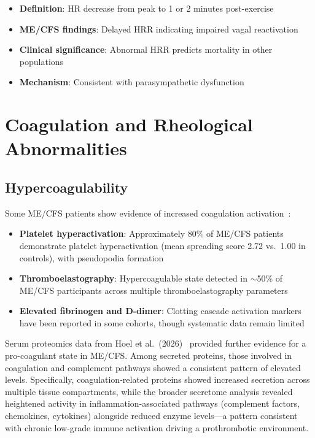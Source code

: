 \begin{itemize}
    \item \textbf{Definition}: HR decrease from peak to 1 or 2 minutes post-exercise
    \item \textbf{ME/CFS findings}: Delayed HRR indicating impaired vagal reactivation
    \item \textbf{Clinical significance}: Abnormal HRR predicts mortality in other populations
    \item \textbf{Mechanism}: Consistent with parasympathetic dysfunction
\end{itemize}

\section{Coagulation and Rheological Abnormalities}
\label{sec:coagulation}

\subsection{Hypercoagulability}
\label{sec:hypercoagulability}

Some ME/CFS patients show evidence of increased coagulation activation~\cite{Nunes2022microclots}:

\begin{itemize}
    \item \textbf{Platelet hyperactivation}: Approximately 80\% of ME/CFS patients demonstrate platelet hyperactivation (mean spreading score 2.72 vs.\ 1.00 in controls), with pseudopodia formation~\cite{Nunes2022microclots}
    \item \textbf{Thromboelastography}: Hypercoagulable state detected in $\sim$50\% of ME/CFS participants across multiple thromboelastography parameters~\cite{Nunes2022microclots}
    \item \textbf{Elevated fibrinogen and D-dimer}: Clotting cascade activation markers have been reported in some cohorts, though systematic data remain limited
\end{itemize}

Serum proteomics data from Hoel et al.\ (2026)~\cite{Hoel2026proteome} provided further evidence for a pro-coagulant state in ME/CFS. Among secreted proteins, those involved in coagulation and complement pathways showed a consistent pattern of elevated levels. Specifically, coagulation-related proteins showed increased secretion across multiple tissue compartments, while the broader secretome analysis revealed heightened activity in inflammation-associated pathways (complement factors, chemokines, cytokines) alongside reduced enzyme levels---a pattern consistent with chronic low-grade immune activation driving a prothrombotic environment.


